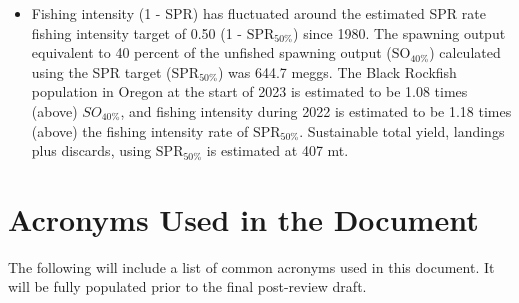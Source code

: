 \documentclass[11pt,
  english,
  letterpaper,
]{article}
\begin{document}
\begin{itemize}
\item  Fishing intensity (1 - SPR) has fluctuated around the estimated SPR rate fishing intensity target of 0.50 (1 - $\text{SPR}_{50\%}$) since 1980. The spawning output equivalent to 40 percent of the unfished spawning output ($\text{SO}_{40\%}$) calculated using the SPR target ($\text{SPR}_{50\%}$) was 644.7 meggs. The Black Rockfish population in Oregon at the start of 2023 is estimated to be 1.08 times (above) $SO_{40\%}$, and fishing intensity during 2022 is estimated to be 1.18 times (above) the fishing intensity rate of $\text{SPR}_{50\%}$. Sustainable total yield, landings plus discards, using $\text{SPR}_{50\%}$ is estimated at 407 mt.   

\end{itemize}

\newpage

\hypertarget{acronyms-used-in-the-document}{%
\section*{Acronyms Used in the Document}\label{acronyms-used-in-the-document}}

The following will include a list of common acronyms used in this document. It will be fully populated prior to the final post-review draft.
\end{document}
